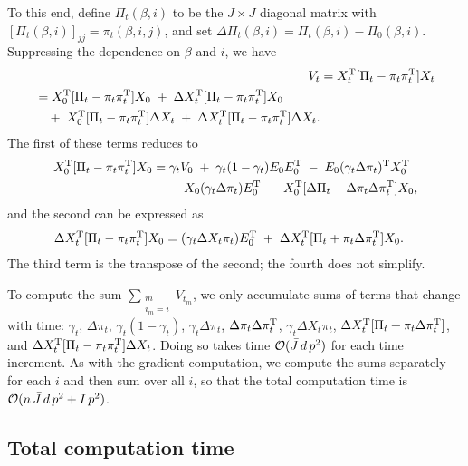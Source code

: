 \documentclass[final]{statsoc}
\begin{document}
To this end, define $\Pi_t(\beta, i)$ to be the $J \times J$ diagonal matrix with
$[\Pi_t(\beta, i)]_{jj} = \pi_t(\beta, i, j)$, and set
$\Delta \Pi_t(\beta, i) = \Pi_t(\beta, i) - \Pi_0(\beta, i)$.
Suppressing the dependence on $\beta$ and $i$, we have
\begin{align*}
  V_t
    &= X_t^{\mathrm{T}} [\Pi_t - \pi_t \pi_t^{\mathrm{T}}] X_t \\
\begin{split}
    &= X_0^{\mathrm{T}} [\Pi_t - \pi_t \pi_t^{\mathrm{T}}] X_0
      \;+\; \Delta X_t^{\mathrm{T}} [\Pi_t - \pi_t \pi_t^{\mathrm{T}}] X_0\\
      &\quad+\; X_0^{\mathrm{T}} [\Pi_t - \pi_t \pi_t^{\mathrm{T}}] \Delta X_t
      \;+\; \Delta X_t^{\mathrm{T}} [\Pi_t - \pi_t \pi_t^{\mathrm{T}}] \Delta X_t.
\end{split}
\end{align*}
The first of these terms reduces to
\begin{align*}
  X_0^{\mathrm{T}} [ \Pi_t - \pi_t \pi_t^{\mathrm{T}}] X_0
    &= \gamma_t V_0
    \;+\; \gamma_t (1 - \gamma_t) E_0 E_0^{\mathrm{T}}
    \;-\; E_0 (\gamma_t \Delta \pi_t)^{\mathrm{T}} X_0^{\mathrm{T}}  \\
    &\quad-\; X_0 (\gamma_t \Delta \pi_t) E_0^{\mathrm{T}}
    \;+\; X_0^{\mathrm{T}} [ \Delta \Pi_t - \Delta \pi_t \Delta \pi_t^{\mathrm{T}} ] X_0,
\end{align*}
and the second can be expressed as
\begin{align*}
  \Delta X_t^{\mathrm{T}} [ \Pi_t - \pi_t \pi_t^{\mathrm{T}}] X_0
    &= (\gamma_t \Delta X_t \pi_t) E_0^{\mathrm{T}}
    \;+\; \Delta X_t^{\mathrm{T}} [\Pi_t + \pi_t \Delta \pi_t^{\mathrm{T}}] X_0.
\end{align*}
The third term is the transpose of the second; the fourth does not
simplify.

To compute the sum $\sum_{\substack{m \\ i_m = i}} V_{t_m}$, we only
accumulate sums of terms that change with time:
$\gamma_t$,
$\Delta \pi_t$,
$\gamma_t(1 - \gamma_t)$,
$\gamma_t \Delta \pi_t$,
$\Delta \pi_t \Delta \pi_t^{\mathrm{T}}$,
$\gamma_t \Delta X_t \pi_t$,
$\Delta X_t^{\mathrm{T}} [\Pi_t + \pi_t \Delta \pi_t^{\mathrm{T}}]$,
and
$\Delta X_t^{\mathrm{T}} [\Pi_t - \pi_t \pi_t^{\mathrm{T}}] \Delta X_t$.
Doing so takes time $\mathcal{O}(\bar J \, d \, p^2)$ for each time increment.  As with
the gradient computation, we compute the sums separately for each $i$ and then
sum over all $i$, so that the total computation time is
$\mathcal{O}(n \, \bar J \, d \, p^2 + I \, p^2)$.

\subsection{Total computation time}
\end{document}
